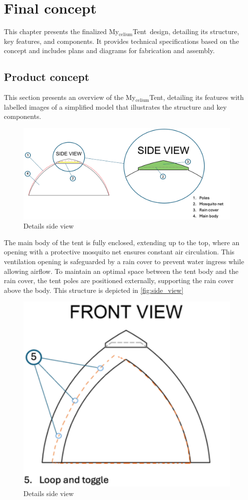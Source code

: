 \documentclass{article}
\newcommand{\myc}{My$_{\text{celium}}$Tent}
\begin{document}
\section{Final concept}
\label{sec:final_concept}
This chapter presents the finalized \myc\ design, detailing its structure, key features,
and components. It provides technical specifications based on the concept and includes
plans and diagrams for fabrication and assembly.

\subsection{Product concept}
This section presents an overview of the \myc, detailing its features with labelled
images of a simplified model that illustrates the structure and key components.

\begin{figure}[ht!]
    \centering
    \includegraphics[width=.85\textwidth]{media/side_view.png}
    \caption{Details side view}
    \label{fig:side_view}
\end{figure}

The main body of the tent is fully enclosed, extending up to the top, where an opening with a
protective mosquito net ensures constant air circulation. This ventilation opening is
safeguarded by a rain cover to prevent water ingress while allowing airflow. To maintain an
optimal space between the tent body and the rain cover, the tent poles are positioned
externally, supporting the rain cover above the body. This structure is depicted in \autoref{fig:side_view}

\newpage
\begin{figure}[ht!]
    \centering
    \includegraphics[width=.35\textwidth]{media/front_view.png}
    \caption{Details side view}
    \label{fig:front_view}
\end{figure}
\end{document}
